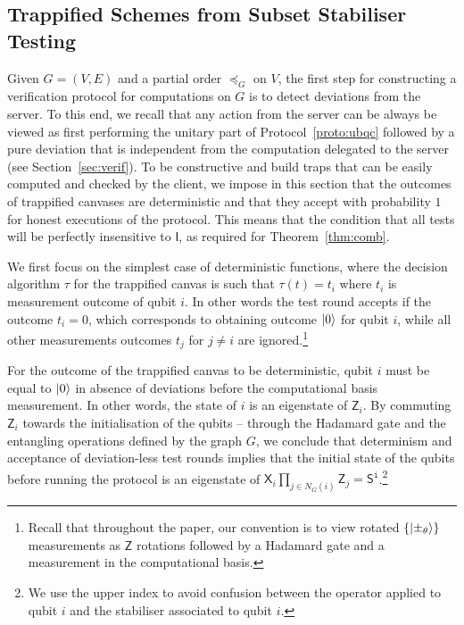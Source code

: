 \documentclass[12pt]{iopart}
\newcommand{\cptp}[1]{\mathsf{#1}} \newcommand{\pd}[1]{\mathcal{#1}}  \newcommand{\sch}[1]{\bm{#1}}
\newcommand{\Id}{\cptp{I}}
\newcommand{\X}{\cptp{X}}
\newcommand{\Z}{\cptp{Z}}
\renewcommand{\1}{\mathds{1}}
\begin{document}
\subsection{Trappified Schemes from Subset Stabiliser Testing}

Given $G=(V,E)$ and a partial order $\preceq_G$ on $V$, the first step for constructing a verification protocol for computations on $G$ is to detect deviations from the server.
To this end, we recall that any action from the server can be always be viewed as first performing the unitary part of Protocol~\ref{proto:ubqc} followed by a pure deviation that is independent from the computation delegated to the server (see Section~\ref{sec:verif}).
To be constructive and build traps that can be easily computed and checked by the client, we impose in this section that the outcomes of trappified canvases are deterministic and that they accept with probability $1$ for honest executions of the protocol. This means that the condition that all tests will be perfectly insensitive to $\Id$, as required for Theorem~\ref{thm:comb}.



We first focus on the simplest case of deterministic functions,
where the decision algorithm $\tau$ for the trappified canvas
is such that $\tau(t) = t_i$ where $t_i$ is
measurement outcome of qubit $i$. In other words the test
round accepts if the outcome $t_i = 0$, which corresponds to obtaining
outcome $\ket 0$ for qubit $i$, while all other measurements
outcomes $t_j$ for $j \neq i$ are ignored.\footnote{Recall that throughout
the paper, our convention is to view rotated $\{\ket{\pm_\theta}\}$
measurements as $\Z$ rotations followed by a Hadamard gate and a
measurement in the computational basis.}

For the outcome of the trappified canvas to be deterministic, qubit $i$ must be equal to
$\ket 0$ in absence of deviations before the computational basis
measurement. In other words, the state of $i$ is an eigenstate
of $\Z_i$. By commuting $\Z_i$
towards the initialisation of the qubits -- through the Hadamard gate and the entangling
operations defined by the graph $G$, 
we conclude that determinism and acceptance of
deviation-less test rounds implies that the initial state of the
qubits before running the protocol is an eigenstate of
$\X_i \prod_{j \in N_G(i)} \Z_j = \cptp S^{\mathtt{i}}$.\footnote{We use the upper index to avoid confusion between the operator applied to qubit $i$ and the stabiliser associated to qubit $i$.}
\end{document}
